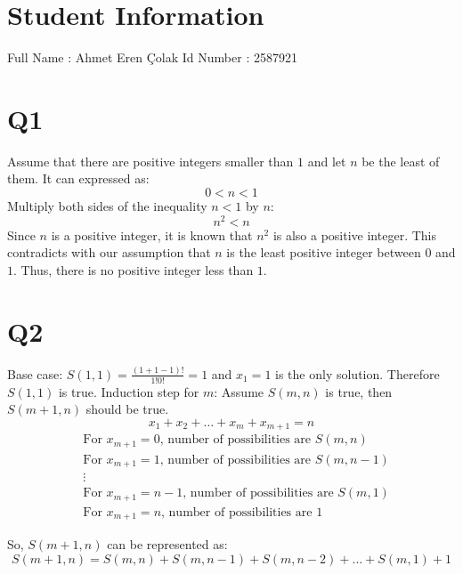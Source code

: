 \documentclass[11pt]{article}
\begin{document}
\section*{Student Information } 
Full Name :  Ahmet Eren Çolak \newline
Id Number :  2587921


\section*{Q1}
Assume that there are positive integers smaller than $1$ and let $n$ be the least of them. It can expressed as:
	\begin{equation*}
		0 < n < 1
	\end{equation*}
Multiply both sides of the inequality $n < 1$ by $n$:
	\begin{equation*}
		n^2 < n
	\end{equation*} 
Since $n$ is a positive integer, it is known that $n^2$ is also a positive integer. This contradicts with our assumption that $n$ is the least positive integer between $0$ and $1$. Thus, there is no positive integer less than $1$.

\section*{Q2}
Base case: $S(1,1)=\frac{(1+1-1)!}{1!0!}=1$ and $x_1=1$ is the only solution. Therefore $S(1,1)$ is true. \newline
Induction step for $m$:
Assume $S(m,n)$ is true, then $S(m+1, n)$ should be true.
\begin{equation*}
	x_1+x_2+\dots+x_m+x_{m+1} = n
\end{equation*}
\begin{align*}
	&\text{For $x_{m+1}=0$, number of possibilities are $S(m,n)$} \\
	&\text{For $x_{m+1}=1$, number of possibilities are $S(m,n-1)$} \\
	&\vdots \\
	&\text{For $x_{m+1}=n-1$, number of possibilities are $S(m,1)$} \\
	&\text{For $x_{m+1}=n$, number of possibilities are $1$}
\end{align*}

So, $S(m+1,n)$ can be represented as:
\begin{equation*}
	S(m+1,n)=S(m,n)+S(m,n-1)+S(m,n-2)+\dots+S(m,1)+1
\end{equation*}
\end{document}

